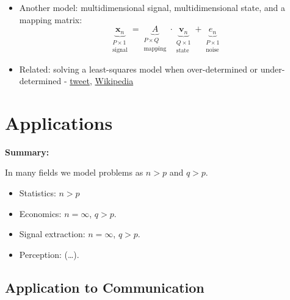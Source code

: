 \documentclass[
  10pt,
  letterpaper,
  DIV=11,
  numbers=noendperiod,
  oneside]{scrartcl}
\providecommand{\tightlist}{%
  \setlength{\itemsep}{0pt}\setlength{\parskip}{0pt}}\usepackage{longtable,booktabs,array}
\newcommand{\bm}[1]{\boldsymbol{#1}}
\newcommand{\utt}[3]{\underbrace{#1}_{\substack{\text{#2}\\\text{#3}}}}
\begin{document}
\begin{itemize}
\item
  Another model: multidimensional signal, multidimensional state, and a
  mapping matrix:
  \[\utt{\bm{x}_n}{$P\times 1$}{signal} = \utt{A}{$P\times Q$}{mapping} \cdot \utt{\bm{v}_n}{$Q\times1$}{state}+ 
      \utt{e_n}{$P\times1$}{noise}
   \]
\item
  Related: solving a least-squares model when over-determined or
  under-determined -
  \href{https://twitter.com/gabrielpeyre/status/1779736411366924549/photo/1}{tweet},
  \href{https://en.wikipedia.org/wiki/Least_squares}{Wikipedia}
\end{itemize}

\section{Applications}\label{applications}

\marginnote{\begin{footnotesize}

\[\xymatrix@R=1em@C=.5em{
   \txt{high-\\dimensional\\state} & \txt{low-\\dimensional\\signal} & \txt{high-\\dimensional\\representation} \\
   v_1\ar[dr] & & \hat{v}_1 \\
         & \boxed{x_1}\ar[ur]\ar[dr] & \\
   v_2\ar[ur] & & \hat{v}_2}
\]

\end{footnotesize}}

\textbf{Summary:}

In many fields we model problems as \(n>p\) and \(q>p\).

\begin{itemize}
\tightlist
\item
  Statistics: \(n>p\)
\item
  Economics: \(n=\infty\), \(q>p\).
\item
  Signal extraction: \(n=\infty\), \(q>p\).
\item
  Perception: (\ldots).
\end{itemize}

\subsection{Application to
Communication}\label{application-to-communication}
\end{document}
